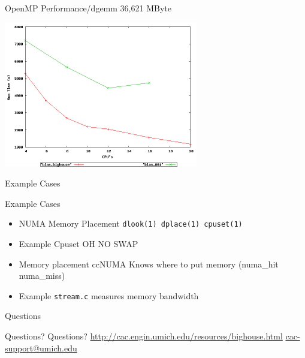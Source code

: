 \documentclass[handout]{beamer}
\begin{document}
\begin{frame}{OpenMP Performance/dgemm 36,621 MByte}
 \begin{center}\includegraphics[height=2.5in]{blas}\end{center}
\end{frame}

\begin{frame}{Example Cases}
 \begin{block}{Example Cases}
  \begin{itemize}
   \item <1-2>NUMA Memory Placement \texttt{dlook(1) dplace(1) cpuset(1)}
   \item <2>Example Cpuset OH NO SWAP
   \item <3-4>Memory placement ccNUMA Knows where to put memory (numa\_hit numa\_miss)
   \item<4> Example \texttt{stream.c} measures memory bandwidth
  \end{itemize}
 \end{block}
\end{frame}

\begin{frame}{Questions}
 \begin{block}{Questions?}
 Questions?
 \url{http://cac.engin.umich.edu/resources/bighouse.html}
 \url{cac-support@umich.edu}
 \end{block}
\end{frame}
\end{document}
